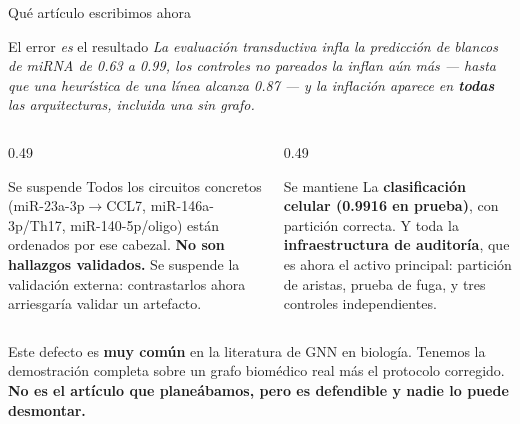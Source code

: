\begin{frame}{Qu\'e art\'iculo escribimos ahora}
  \begin{block}{El error \emph{es} el resultado}
    \small
    \emph{La evaluaci\'on transductiva infla la predicci\'on de blancos de miRNA de 0.63 a 0.99, los controles no pareados la inflan a\'un m\'as --- hasta que una heur\'istica de una l\'inea alcanza 0.87 --- y la inflaci\'on aparece en \textbf{todas} las arquitecturas, incluida una sin grafo.}
  \end{block}

  \vspace{0.3em}
  \begin{columns}[T]
    \begin{column}{0.49\textwidth}
      \begin{block}{Se suspende}
        \scriptsize
        Todos los circuitos concretos (miR-23a-3p$\to$CCL7, miR-146a-3p/Th17, miR-140-5p/oligo) est\'an ordenados por ese cabezal. \textbf{No son hallazgos validados.} Se suspende la validaci\'on externa: contrastarlos ahora arriesgar\'ia validar un artefacto.
      \end{block}
    \end{column}
    \begin{column}{0.49\textwidth}
      \begin{block}{Se mantiene}
        \scriptsize
        La \textbf{clasificaci\'on celular (0.9916 en prueba)}, con partici\'on correcta. Y toda la \textbf{infraestructura de auditor\'ia}, que es ahora el activo principal: partici\'on de aristas, prueba de fuga, y tres controles independientes.
      \end{block}
    \end{column}
  \end{columns}

  \vspace{0.3em}
  \begin{block}{}
    \scriptsize
    Este defecto es \textbf{muy com\'un} en la literatura de GNN en biolog\'ia. Tenemos la demostraci\'on completa sobre un grafo biom\'edico real m\'as el protocolo corregido. \textbf{No es el art\'iculo que plane\'abamos, pero es defendible y nadie lo puede desmontar.}
  \end{block}
\end{frame}

